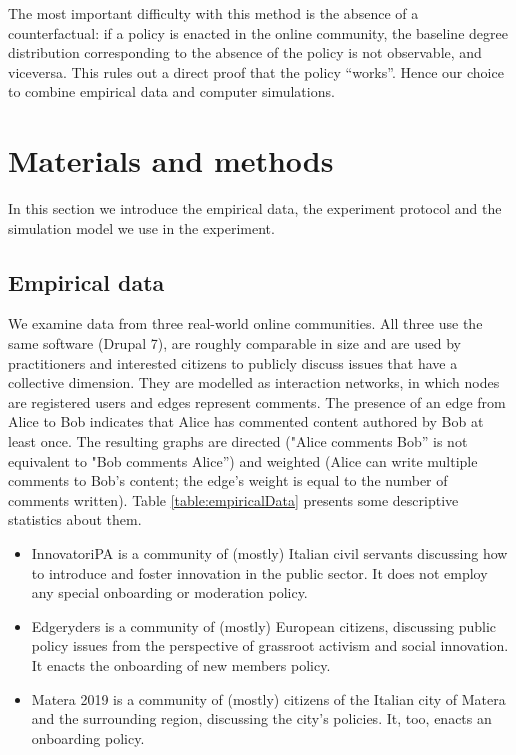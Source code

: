 \documentclass{article}
\begin{document}
The most important difficulty with this method is the absence of a counterfactual: if a policy is enacted in the online community, the baseline degree distribution corresponding to the absence of the policy is not observable, and viceversa. This rules out a direct proof that the policy ``works''. Hence our choice to combine empirical data and computer simulations. 


\section{Materials and methods}

In this section we introduce the empirical data, the experiment protocol and the simulation model we use in the experiment. 

\subsection{Empirical data}
\label{sec:empirical_data}

We examine data from three real-world online communities. All three use the same software (Drupal 7), are roughly comparable in size and are used by practitioners and interested citizens to publicly discuss issues that have a collective dimension. They are modelled as interaction networks, in which nodes are registered users and edges represent comments. The presence of an edge from Alice to Bob indicates that Alice has commented content authored by Bob at least once. The resulting graphs are directed ("Alice comments Bob'' is not equivalent to "Bob comments Alice'') and weighted (Alice can write multiple comments to Bob's content; the edge's weight is equal to the number of comments written). Table \ref{table:empiricalData} presents some descriptive statistics about them. 

\begin{itemize}
\item InnovatoriPA is a community of (mostly) Italian civil servants discussing how to introduce and foster innovation in the public sector. It does not employ any special onboarding or moderation policy. 
\item Edgeryders is a community of (mostly) European citizens, discussing public policy issues from the perspective of grassroot activism and social innovation. It enacts the onboarding of new members policy. 
\item Matera 2019 is a community of (mostly) citizens of the Italian city of Matera and the surrounding region, discussing the city's policies.
It, too, enacts an onboarding policy.
\end{itemize}
\end{document}
